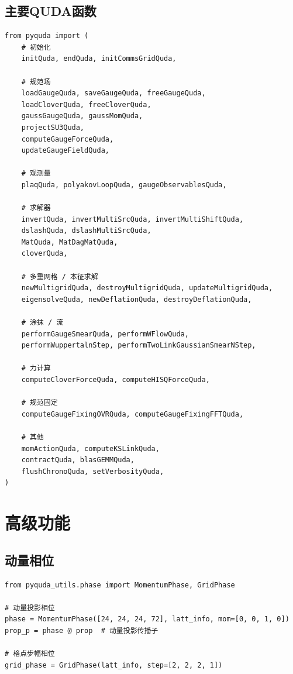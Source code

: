 \documentclass[12pt,a4paper]{ctexart}
\begin{document}
\subsection{主要QUDA函数}

\begin{lstlisting}[caption={直接调用的QUDA函数}]
from pyquda import (
    # 初始化
    initQuda, endQuda, initCommsGridQuda,

    # 规范场
    loadGaugeQuda, saveGaugeQuda, freeGaugeQuda,
    loadCloverQuda, freeCloverQuda,
    gaussGaugeQuda, gaussMomQuda,
    projectSU3Quda,
    computeGaugeForceQuda,
    updateGaugeFieldQuda,

    # 观测量
    plaqQuda, polyakovLoopQuda, gaugeObservablesQuda,

    # 求解器
    invertQuda, invertMultiSrcQuda, invertMultiShiftQuda,
    dslashQuda, dslashMultiSrcQuda,
    MatQuda, MatDagMatQuda,
    cloverQuda,

    # 多重网格 / 本征求解
    newMultigridQuda, destroyMultigridQuda, updateMultigridQuda,
    eigensolveQuda, newDeflationQuda, destroyDeflationQuda,

    # 涂抹 / 流
    performGaugeSmearQuda, performWFlowQuda,
    performWuppertalnStep, performTwoLinkGaussianSmearNStep,

    # 力计算
    computeCloverForceQuda, computeHISQForceQuda,

    # 规范固定
    computeGaugeFixingOVRQuda, computeGaugeFixingFFTQuda,

    # 其他
    momActionQuda, computeKSLinkQuda,
    contractQuda, blasGEMMQuda,
    flushChronoQuda, setVerbosityQuda,
)
\end{lstlisting}

\section{高级功能}

\subsection{动量相位}

\begin{lstlisting}[caption={动量相位}]
from pyquda_utils.phase import MomentumPhase, GridPhase

# 动量投影相位
phase = MomentumPhase([24, 24, 24, 72], latt_info, mom=[0, 0, 1, 0])
prop_p = phase @ prop  # 动量投影传播子

# 格点步幅相位
grid_phase = GridPhase(latt_info, step=[2, 2, 2, 1])
\end{lstlisting}
\end{document}
